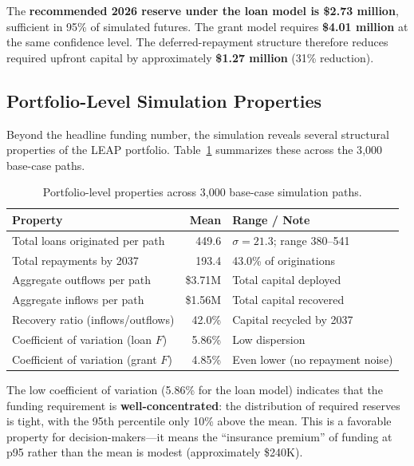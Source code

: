 \documentclass[11pt, letterpaper]{article}
\begin{document}
The \textbf{recommended 2026 reserve under the loan model is \$2.73 million}, sufficient in 95\% of simulated futures. The grant model requires \textbf{\$4.01 million} at the same confidence level. The deferred-repayment structure therefore reduces required upfront capital by approximately \textbf{\$1.27 million} (31\% reduction).

\subsection{Portfolio-Level Simulation Properties}

Beyond the headline funding number, the simulation reveals several structural properties of the LEAP portfolio. Table~\ref{tab:portfolio_props} summarizes these across the 3{,}000 base-case paths.

\begin{table}[H]
  \centering
  \caption{Portfolio-level properties across 3{,}000 base-case simulation paths.}
  \label{tab:portfolio_props}
  \begin{tabular}{@{}lrl@{}}
    \toprule
    \textbf{Property} & \textbf{Mean} & \textbf{Range / Note} \\
    \midrule
    Total loans originated per path & 449.6 & $\sigma = 21.3$; range 380--541 \\
    Total repayments by 2037 & 193.4 & 43.0\% of originations \\
    Aggregate outflows per path & \$3.71M & Total capital deployed \\
    Aggregate inflows per path & \$1.56M & Total capital recovered \\
    Recovery ratio (inflows/outflows) & 42.0\% & Capital recycled by 2037 \\
    Coefficient of variation (loan $F$) & 5.86\% & Low dispersion \\
    Coefficient of variation (grant $F$) & 4.85\% & Even lower (no repayment noise) \\
    \bottomrule
  \end{tabular}
\end{table}

The low coefficient of variation (5.86\% for the loan model) indicates that the funding requirement is \textbf{well-concentrated}: the distribution of required reserves is tight, with the 95th percentile only 10\% above the mean. This is a favorable property for decision-makers---it means the ``insurance premium'' of funding at p95 rather than the mean is modest (approximately \$240K).
\end{document}
